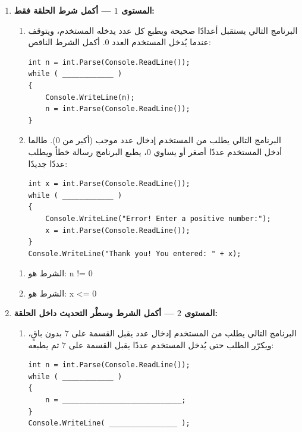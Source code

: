 \documentclass[14pt]{extarticle}
\begin{document}
\begin{enumerate}[resume, itemsep=2em]
\item \textbf{المستوى $1$ — أكمل شرط الحلقة فقط:}
\begin{enumerate}
    \item البرنامج التالي يستقبل أعدادًا صحيحة ويطبع كل عدد يدخله المستخدم، ويتوقف عندما يُدخل المستخدم العدد $0$. أكمل الشرط الناقص:
\begin{boxCode}
\begin{english}
\begin{verbatim}
int n = int.Parse(Console.ReadLine());
while ( ____________ )
{
    Console.WriteLine(n);
    n = int.Parse(Console.ReadLine());
}
\end{verbatim}
\end{english}
\end{boxCode}

    \item البرنامج التالي يطلب من المستخدم إدخال عدد موجب (أكبر من $0$). طالما أدخل المستخدم عددًا أصغر أو يساوي $0$، يطبع البرنامج رسالة خطأ ويطلب عددًا جديدًا:
\begin{boxCode}
\begin{english}
\begin{verbatim}
int x = int.Parse(Console.ReadLine());
while ( ____________ )
{
    Console.WriteLine("Error! Enter a positive number:");
    x = int.Parse(Console.ReadLine());
}
Console.WriteLine("Thank you! You entered: " + x);
\end{verbatim}
\end{english}
\end{boxCode}
\end{enumerate}
\ifwithsols
\begin{boxSolution}
\begin{enumerate}[nosep]
    \item الشرط هو: \textenglish{n != 0}
    \item الشرط هو: \textenglish{x <= 0}
\end{enumerate}
\end{boxSolution}
\fi
\filbreak

\item \textbf{المستوى $2$ — أكمل الشرط وسطْر التحديث داخل الحلقة:}
\begin{enumerate}
    \item البرنامج التالي يطلب من المستخدم إدخال عدد يقبل القسمة على $7$ بدون باقٍ، ويكرّر الطلب حتى يُدخل المستخدم عددًا يقبل القسمة على $7$ ثم يطبعه:
\begin{boxCode}
\begin{english}
\begin{verbatim}
int n = int.Parse(Console.ReadLine());
while ( ____________ )
{
    n = ____________________________;
}
Console.WriteLine( ________________ );
\end{verbatim}
\end{english}
\end{boxCode}


\end{enumerate}
\end{enumerate}
\end{document}

